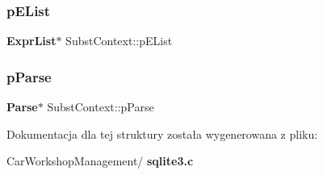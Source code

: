 \mbox{\label{struct_subst_context_a43336e8c2442bac062bc96e1a0674a95}} 
\subsubsection{pEList}
{\footnotesize\ttfamily \textbf{ Expr\+List}$\ast$ Subst\+Context\+::p\+E\+List}

\mbox{\label{struct_subst_context_aea8056722d58fbcdb342cbfad7422ad4}} 
\subsubsection{pParse}
{\footnotesize\ttfamily \textbf{ Parse}$\ast$ Subst\+Context\+::p\+Parse}



Dokumentacja dla tej struktury została wygenerowana z pliku\+:\begin{DoxyCompactItemize}
\item 
Car\+Workshop\+Management/\textbf{ sqlite3.\+c}\end{DoxyCompactItemize}
